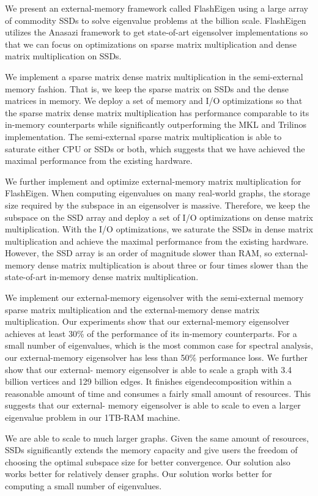 We present an external-memory framework called FlashEigen using a large array
of commodity SSDs to solve eigenvalue problems at the billion scale. FlashEigen
utilizes the Anasazi framework to get state-of-art eigensolver implementations
so that we can focus on optimizations on sparse matrix multiplication and dense
matrix multiplication on SSDs.

We implement a sparse matrix dense matrix multiplication in the semi-external
memory fashion. That is, we keep the sparse matrix on SSDs and the dense matrices
in memory. We deploy a set of memory and I/O optimizations so that the sparse
matrix dense matrix multiplication has performance comparable to its in-memory
counterparts while significantly outperforming the MKL and Trilinos implementation.
The semi-external sparse matrix multiplication is able to saturate either CPU or
SSDs or both, which suggests that we have achieved the maximal performance from
the existing hardware.

We further implement and optimize external-memory matrix multiplication for
FlashEigen. When computing eigenvalues on many real-world graphs, the storage
size required by the subspace in an eigensolver is massive. Therefore, we keep
the subspace on the SSD array and deploy a set of I/O optimizations on dense
matrix multiplication. With the I/O optimizations, we saturate the SSDs in
dense matrix multiplication and achieve the maximal performance from the existing
hardware. However, the SSD array is an order of magnitude slower than RAM, so
external-memory dense matrix multiplication is about three or four times slower
than the state-of-art in-memory dense matrix multiplication.

We implement our external-memory eigensolver with the semi-external memory
sparse matrix multiplication and the external-memory dense matrix multiplication.
Our experiments show that our external-memory eigensolver achieves at least
30\% of the performance of its in-memory counterparts. For a small number of
eigenvalues, which is the most common case for spectral analysis, our external-memory
eigensolver has less than 50\% performance loss. We further show that our external-
memory eigensolver is able to scale a graph with 3.4 billion vertices and 129
billion edges. It finishes eigendecomposition within a reasonable amount of time
and consumes a fairly small amount of resources. This suggests that our external-
memory eigensolver is able to scale to even a larger eigenvalue problem in our
1TB-RAM machine.

We are able to scale to much larger graphs.
Given the same amount of resources, SSDs significantly extends the memory capacity
and give users the freedom of choosing the optimal subspace size for better convergence.
Our solution also works better for relatively denser graphs.
Our solution works better for computing a small number of eigenvalues.
